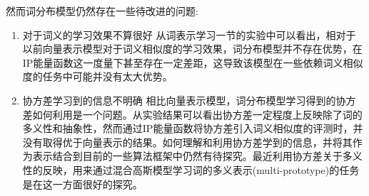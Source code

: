 \documentclass[a4paper,13pt]{article}
\begin{document}
\begin{spacing}{1.5}
然而词分布模型仍然存在一些待改进的问题:
\begin{enumerate}
	\item 对于词义的学习效果不算很好
从词表示学习一节的实验中可以看出，相对于以前向量表示模型对于词义相似度的学习效果，词分布模型并不存在优势，在IP能量函数这一度量下甚至存在一定差距，这导致该模型在一些依赖词义相似度的任务中可能并没有太大优势。

	\item 协方差学习到的信息不明确
相比向量表示模型，词分布模型学习得到的协方差如何利用是一个问题。从实验结果可以看出协方差一定程度上反映除了词的多义性和抽象性，然而通过IP能量函数将协方差引入词义相似度的评测时，并没有取得优于向量表示的结果。如何理解和利用协方差学到的信息，并将其作为表示结合到目前的一些算法框架中仍然有待探究。最近利用协方差关于多义性的反映，用来通过混合高斯模型学习词的多义表示(multi-prototype)的任务是在这一方面很好的探究。
\end{enumerate}

\end{spacing}
\newpage


\end{document}
